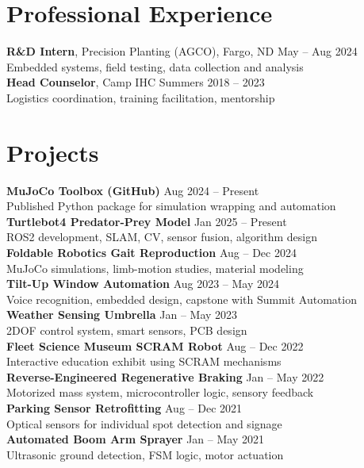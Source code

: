 \documentclass[10pt]{article}
\begin{document}
\section*{Professional Experience}
\textbf{R\&D Intern}, Precision Planting (AGCO), Fargo, ND \hfill May -- Aug 2024\\
\hspace*{2em}Embedded systems, field testing, data collection and analysis\\
\textbf{Head Counselor}, Camp IHC \hfill Summers 2018 -- 2023\\
\hspace*{2em}Logistics coordination, training facilitation, mentorship

\section*{Projects}
\textbf{MuJoCo Toolbox (GitHub)} \hfill Aug 2024 -- Present\\
\hspace*{2em}Published Python package for simulation wrapping and automation
\\
\textbf{Turtlebot4 Predator-Prey Model} \hfill Jan 2025 -- Present\\
\hspace*{2em}ROS2 development, SLAM, CV, sensor fusion, algorithm design
\\
\textbf{Foldable Robotics Gait Reproduction} \hfill Aug -- Dec 2024\\
\hspace*{2em}MuJoCo simulations, limb-motion studies, material modeling
\\
\textbf{Tilt-Up Window Automation} \hfill Aug 2023 -- May 2024\\
\hspace*{2em}Voice recognition, embedded design, capstone with Summit Automation
\\
\textbf{Weather Sensing Umbrella} \hfill Jan -- May 2023\\
\hspace*{2em}2DOF control system, smart sensors, PCB design
\\
\textbf{Fleet Science Museum SCRAM Robot} \hfill Aug -- Dec 2022\\
\hspace*{2em}Interactive education exhibit using SCRAM mechanisms
\\
\textbf{Reverse-Engineered Regenerative Braking} \hfill Jan -- May 2022\\
\hspace*{2em}Motorized mass system, microcontroller logic, sensory feedback
\\
\textbf{Parking Sensor Retrofitting} \hfill Aug -- Dec 2021\\
\hspace*{2em}Optical sensors for individual spot detection and signage
\\
\textbf{Automated Boom Arm Sprayer} \hfill Jan -- May 2021\\
\hspace*{2em}Ultrasonic ground detection, FSM logic, motor actuation
\end{document}
